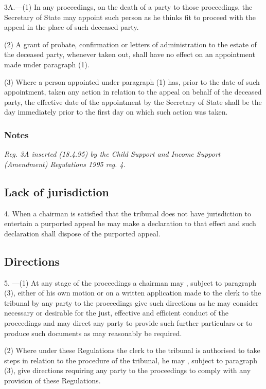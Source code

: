 \documentclass[a4paper]{article}
\newcommand\amendment[1]{\subsubsection*{Notes}{\itshape\frenchspacing\footnotesize #1 \par}}
\begin{document}
3A.—(1) In any proceedings, on the death of a party to those proceedings, the Secretary of State may appoint such person as he thinks fit to proceed with the appeal in the place of such deceased party.

(2) A grant of probate, confirmation or letters of administration to the estate of the deceased party, whenever taken out, shall have no effect on an appointment made under paragraph (1).

(3) Where a person appointed under paragraph (1) has, prior to the date of such appointment, taken any action in relation to the appeal on behalf of the deceased party, the effective date of the appointment by the Secretary of State shall be the day immediately prior to the first day on which such action was taken.

\amendment{
Reg. 3A inserted (18.4.95) by the Child Support and Income Support (Amendment) Regulations 1995 reg. 4.
}

\subsection[4. Lack of jurisdiction]{Lack of jurisdiction}

4.  When a chairman is satisfied that the tribunal does not have jurisdiction to entertain a purported appeal he may make a declaration to that effect and such declaration shall dispose of the purported appeal.

\subsection[5. Directions]{Directions}

5.%
---(1)  %
  At any stage of the proceedings a chairman may%
, subject to paragraph (3),  %
either of his own motion or on a written application made to the clerk to the tribunal by any party to the proceedings give such directions as he may consider necessary or desirable for the just, effective and efficient conduct of the proceedings and may direct any party to provide such further particulars or to produce such documents as may reasonably be required.

(2) Where under these Regulations the clerk to the tribunal is authorised to take steps in relation to the procedure of the tribunal, he may%
, subject to paragraph (3),  %
give directions requiring any party to the proceedings to comply with any provision of these Regulations.
\end{document}
